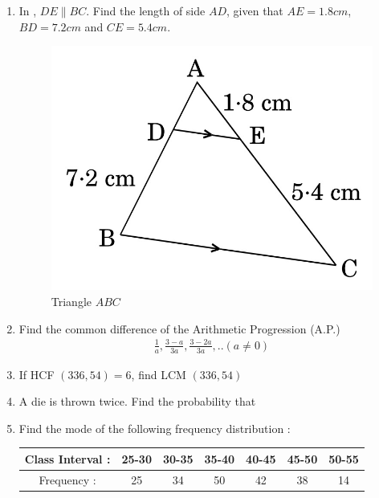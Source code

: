 \documentclass[12pt,-letter paper]{article}
\providecommand{\brak}[1]{\ensuremath{\left(#1\right)}}
\begin{document}
\begin{enumerate}
\item In  , $DE \parallel BC$. Find the length of side $AD$, given that $AE = 1.8 cm$,$ BD = 7.2 cm$ and $ CE = 5.4 cm$.
\begin{figure}[H]
    \centering
    \includegraphics[width=\columnwidth]{img2.jpg}
    \caption{Triangle $ABC$ }
    \label{fig:Fig_2}
\end{figure}

\item Find the common difference of the Arithmetic Progression (A.P.) 
\begin{align*}
\frac{1}{a} , \frac{3-a}{3a},\frac{3-2a}{3a} , . . (a \neq 0)
\end{align*}

\item If HCF $\brak{336, 54} = 6$, find LCM $\brak{336, 54}$

\item A die is thrown twice. Find the probability that
\begin{enumerate}

\end{enumerate}


\item Find the mode of the following frequency distribution :
\begin{center}
 \begin{tabular}{|c | c | c | c| c | c | c |} 
 \hline
 Class Interval : & 25-30 & 30-35 & 35-40 & 40-45 & 45-50& 50-55  \\ 
\hline
 Frequency : & 25 & 34 & 50 & 42 & 38 & 14 \\ 
 \hline
\end{tabular}
\end{center}


\end{enumerate}
\end{document}

